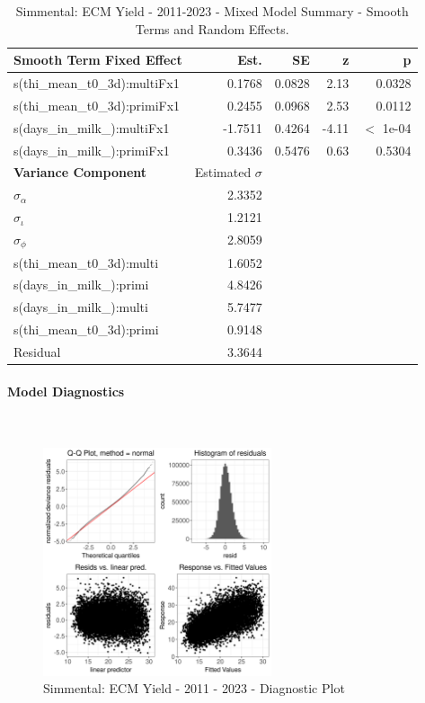 \newpage
\begin{table}[H]
\centering
\begin{tabular}
{l | r | r | r | r}
\textbf{Smooth Term Fixed Effect} & Est. & SE & z & p\\
\hline
\hline
s(thi\_mean\_t0\_3d):multiFx1 & 0.1768 & 0.0828 & 2.13 & 0.0328\\
s(thi\_mean\_t0\_3d):primiFx1 & 0.2455 & 0.0968 & 2.53 & 0.0112\\
s(days\_in\_milk\_):multiFx1 & -1.7511 & 0.4264 & -4.11 & $<$ 1e-04\\
s(days\_in\_milk\_):primiFx1 & 0.3436 & 0.5476 & 0.63 & 0.5304\\
\hline
\textbf{Variance Component} & Estimated $\sigma$ & & & \\
\hline
\hline
$\sigma_\alpha$ & 2.3352 & & & \\
$\sigma_\iota$ & 1.2121 & & & \\
$\sigma_\phi$ & 2.8059 & & & \\
s(thi\_mean\_t0\_3d):multi &  1.6052 & & & \\
s(days\_in\_milk\_):primi & 4.8426 & & & \\
s(days\_in\_milk\_):multi & 5.7477 & & & \\
s(thi\_mean\_t0\_3d):primi & 0.9148 & & & \\
Residual & 3.3644 & & & \\
\end{tabular}
\caption[]{Simmental: ECM Yield - 2011-2023 - Mixed Model Summary - Smooth Terms and Random Effects.}
\end{table}


\paragraph{Model Diagnostics} \quad \\
\begin{figure}[H]
    \centering
    \includegraphics[width=0.6\textwidth]{thesis/figures/models/ecm/after2010/si_ecm_after2010/si_ecm_after2010_diagnostics.png}
    \caption[]{Simmental: ECM Yield - 2011 - 2023 - Diagnostic Plot}
\end{figure}

